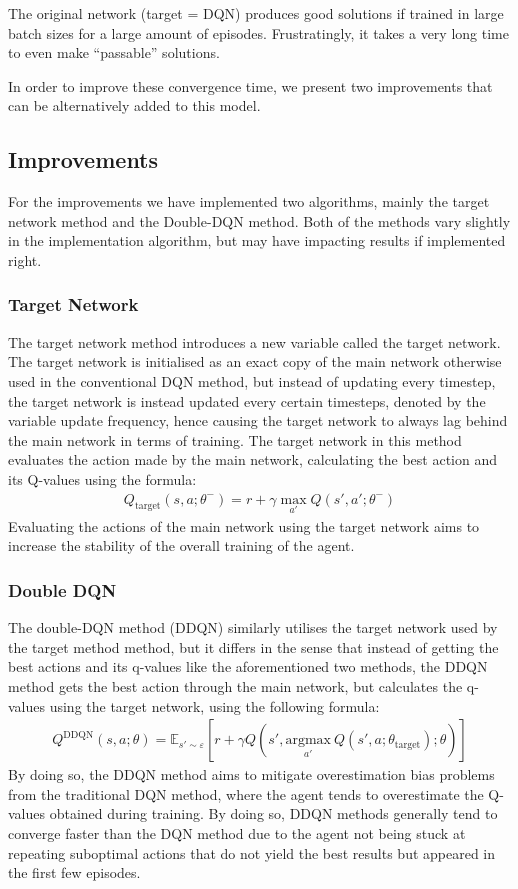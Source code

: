 The original network (target = DQN) produces good solutions if trained in large batch sizes for a large amount of episodes.
Frustratingly, it takes a very long time to even make ``passable'' solutions.

In order to improve these convergence time, we present two improvements that can be alternatively added to this model.


\subsection{Improvements}
For the improvements we have implemented two algorithms, mainly the target network method and the
Double-DQN method. Both of the methods vary slightly in the implementation algorithm, but may have
impacting results if implemented right.
\subsubsection{Target Network}
The target network method introduces a new variable called the target network. The target network is initialised as an exact copy of the main network otherwise used in the conventional DQN method, but instead of updating every timestep, the target network is instead updated every certain timesteps, denoted by the variable update frequency, hence causing the target network to always lag behind the main network in terms of training.
The target network in this method evaluates the action made by the main network, calculating the best action and its Q-values using the formula:
\begin{align*}
    Q_{\text{target}}(s, a ; \theta^{-}) = r + \gamma \max_{a'} Q(s', a' ; \theta^{-})
\end{align*}
Evaluating the actions of the main network using the target network aims to increase the stability of the
overall training of the agent.

\subsubsection{Double DQN}

The double-DQN method (DDQN) similarly utilises the target network used by the target method method, but it differs in the sense that instead of getting the best actions and its q-values like the aforementioned two methods, the DDQN method gets the best action through the main network, but calculates the q-values using the target network, using the following formula:
\begin{align*}
    Q^{\text{DDQN}}(s, a ; \theta) = \mathbb{E}_{s' \sim \varepsilon}[r + \gamma Q(s', \underset{a'}{\text{argmax}}\ Q(s', a ; \theta_{\text{target}}) ; \theta)]
\end{align*}
By doing so, the DDQN method aims to mitigate overestimation bias problems from the traditional DQN method, where the agent tends to overestimate the Q-values obtained during training. By doing so, DDQN methods generally tend to converge faster than the DQN method due to the agent not being stuck at repeating suboptimal actions that do not yield the best results but appeared in the first few episodes.

